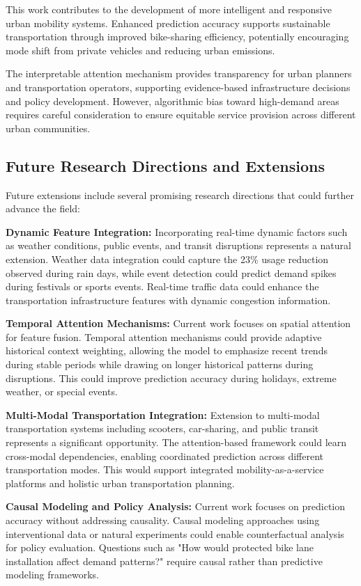 \documentclass[sigconf,review,nonacm]{acmart}
\begin{document}
This work contributes to the development of more intelligent and responsive urban mobility systems. Enhanced prediction accuracy supports sustainable transportation through improved bike-sharing efficiency, potentially encouraging mode shift from private vehicles and reducing urban emissions.

The interpretable attention mechanism provides transparency for urban planners and transportation operators, supporting evidence-based infrastructure decisions and policy development. However, algorithmic bias toward high-demand areas requires careful consideration to ensure equitable service provision across different urban communities.

\subsection{Future Research Directions and Extensions}

Future extensions include several promising research directions that could further advance the field:

\textbf{Dynamic Feature Integration:}
Incorporating real-time dynamic factors such as weather conditions, public events, and transit disruptions represents a natural extension. Weather data integration could capture the 23\% usage reduction observed during rain days, while event detection could predict demand spikes during festivals or sports events. Real-time traffic data could enhance the transportation infrastructure features with dynamic congestion information.

\textbf{Temporal Attention Mechanisms:}
Current work focuses on spatial attention for feature fusion. Temporal attention mechanisms could provide adaptive historical context weighting, allowing the model to emphasize recent trends during stable periods while drawing on longer historical patterns during disruptions. This could improve prediction accuracy during holidays, extreme weather, or special events.

\textbf{Multi-Modal Transportation Integration:}
Extension to multi-modal transportation systems including scooters, car-sharing, and public transit represents a significant opportunity. The attention-based framework could learn cross-modal dependencies, enabling coordinated prediction across different transportation modes. This would support integrated mobility-as-a-service platforms and holistic urban transportation planning.

\textbf{Causal Modeling and Policy Analysis:}
Current work focuses on prediction accuracy without addressing causality. Causal modeling approaches using interventional data or natural experiments could enable counterfactual analysis for policy evaluation. Questions such as "How would protected bike lane installation affect demand patterns?" require causal rather than predictive modeling frameworks.
\end{document}
